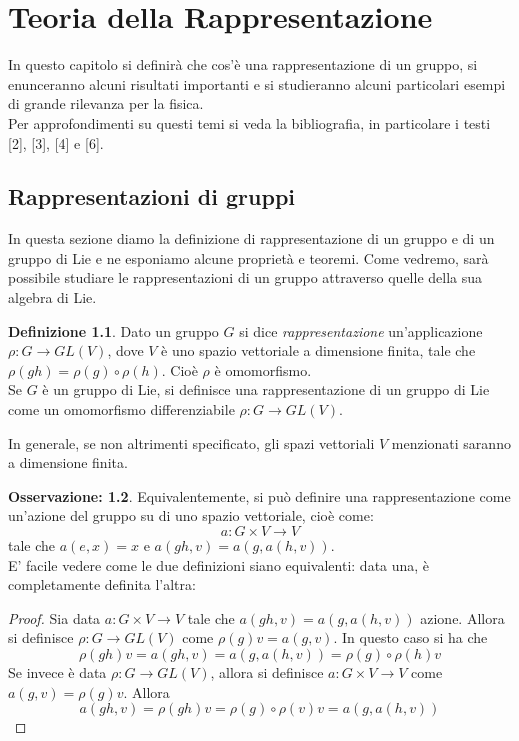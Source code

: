 \documentclass[12pt,a4paper]{report}
\theoremstyle{definition}
\newtheorem{Def}{Definizione}[chapter]
\theoremstyle{definition}
\theoremstyle{definition}
\theoremstyle{definition}
\newtheorem{Obs}[Def]{Osservazione:}
\begin{document}
\chapter{Teoria della Rappresentazione}
In questo capitolo si definirà che cos'è una rappresentazione di un gruppo, si enunceranno alcuni risultati importanti e si studieranno alcuni particolari esempi di grande rilevanza per la fisica.\\
Per approfondimenti su questi temi si veda la bibliografia, in particolare i testi [2], [3], [4] e [6].
\section{Rappresentazioni di gruppi}
In questa sezione diamo la definizione di rappresentazione di un gruppo e di un gruppo di Lie e ne esponiamo alcune proprietà e teoremi.
Come vedremo, sarà possibile studiare le rappresentazioni di un gruppo attraverso quelle della sua algebra di Lie.
\begin{Def}
Dato un gruppo $G$ si dice \textit{rappresentazione} un'applicazione\\ $\rho:G\rightarrow GL(V)$, dove $V$ è uno spazio vettoriale a dimensione finita, tale che $\rho(gh)=\rho(g)\circ\rho(h)$. Cioè $\rho$ è omomorfismo.\\
Se $G$ è un gruppo di Lie, si definisce una rappresentazione di un gruppo di Lie come un omomorfismo differenziabile $\rho:G\rightarrow GL(V)$.
\end{Def}
In generale, se non altrimenti specificato, gli spazi vettoriali $V$ menzionati saranno a dimensione finita.
\begin{Obs}
	Equivalentemente, si può definire una rappresentazione come un'azione del gruppo su di uno spazio vettoriale, cioè come:
	$$a:G\times V\rightarrow V$$
	tale che $a(e,x)=x$ e $a(gh,v)=a(g,a(h,v))$.\\
	E' facile vedere come le due definizioni siano equivalenti: data una, è completamente definita l'altra:
	\begin{proof}
		Sia data $a:G\times V\rightarrow V$
		tale che $a(gh,v)=a(g,a(h,v))$ azione. Allora si definisce $\rho:G\rightarrow GL(V)$ come $\rho(g)v=a(g,v)$. In questo caso si ha che $$\rho(gh)v=a(gh,v)=a(g,a(h,v))=\rho(g)\circ\rho(h)v$$
		Se invece è data $\rho:G\rightarrow GL(V)$, allora si definisce $a:G\times V\rightarrow V$ come $a(g,v)=\rho(g)v$. Allora $$a(gh,v)=\rho(gh)v=\rho(g)\circ\rho(v)v=a(g,a(h,v))$$
	\end{proof}
\end{Obs}
\end{document}
